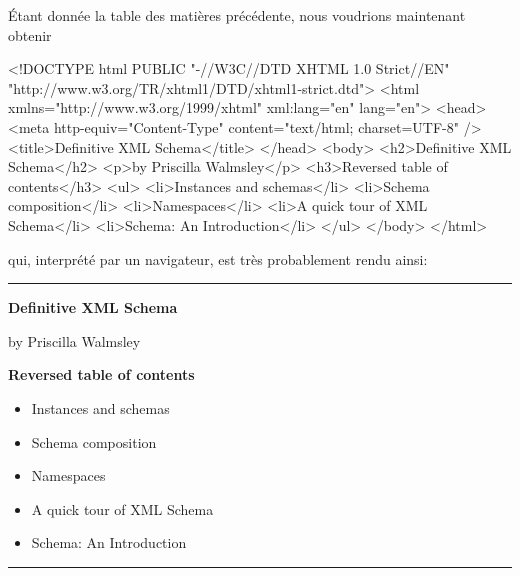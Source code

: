 Étant donnée la table des matières précédente, nous voudrions
maintenant obtenir
\begin{sverb}
<!DOCTYPE html
  PUBLIC "-//W3C//DTD XHTML 1.0 Strict//EN"
         "http://www.w3.org/TR/xhtml1/DTD/xhtml1-strict.dtd">
<html xmlns="http://www.w3.org/1999/xhtml"
      xml:lang="en" lang="en">
   <head>
      <meta http-equiv="Content-Type"
            content="text/html; charset=UTF-8" />
      <title>Definitive XML Schema</title>
   </head>
   <body>
      <h2>Definitive XML Schema</h2>
      <p>by Priscilla Walmsley</p>
      <h3>Reversed table of contents</h3>
      <ul>
         <li>Instances and schemas</li>
         <li>Schema composition</li>
         <li>Namespaces</li>
         <li>A quick tour of XML Schema</li>
         <li>Schema: An Introduction</li>
      </ul>
   </body>
</html>
\end{sverb}
qui, interprété par un navigateur, est très probablement rendu ainsi:

\noindent\rule{\linewidth}{0.5pt}
\noindent\textbf{\large Definitive XML Schema}

\bigskip

\noindent by Priscilla Walmsley

\bigskip

\noindent\textbf{Reversed table of contents}
\begin{itemize}

  \item Instances and schemas
  \item Schema composition
  \item Namespaces
  \item A quick tour of XML Schema
  \item Schema: An Introduction

\end{itemize}
\noindent\rule{\linewidth}{0.5pt}


